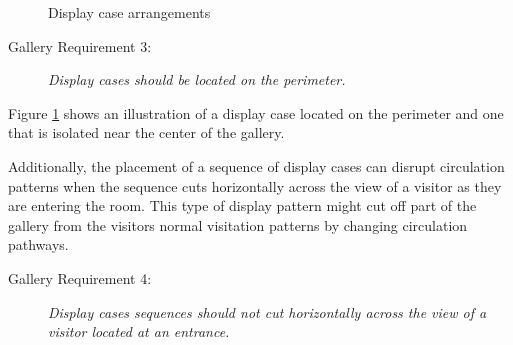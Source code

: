 \documentclass[12pt]{ucthesis}
\begin{document}
\begin{figure}[H]
 \centering
 \hspace{10 mm}
 \caption{Display case arrangements}
\label{display-arrangement}
\end{figure}
 
\begin{description}
\item[Gallery Requirement 3:] \emph{Display cases should be located on the perimeter.}
\end{description} 

Figure \ref{display-arrangement} shows an illustration of a display case located on the perimeter and one that is isolated near the center of the gallery.

Additionally, the placement of a sequence of display cases can disrupt circulation patterns when the sequence cuts horizontally across the view of a visitor as they are entering the room. This type of display pattern might cut off part of the gallery from the visitors normal visitation patterns by changing circulation pathways.

\begin{description}
\item[Gallery Requirement 4:] \emph{Display cases sequences should not cut horizontally across the view of a visitor located at an entrance.}
\end{description} 
\end{document}
